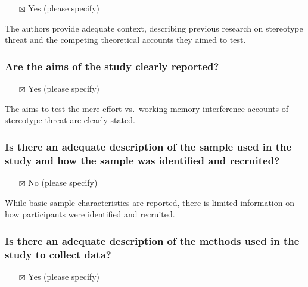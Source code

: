 \documentclass[
  doc, a4paper]{apa7}
\providecommand{\tightlist}{%
  \setlength{\itemsep}{0pt}\setlength{\parskip}{0pt}}
\begin{document}
\begin{itemize}
\tightlist
\item[$\boxtimes$]
  Yes (please specify)
\end{itemize}

The authors provide adequate context, describing previous research on stereotype threat and the competing theoretical accounts they aimed to test.

\subsubsection{Are the aims of the study clearly reported?}\label{are-the-aims-of-the-study-clearly-reported}

\begin{itemize}
\tightlist
\item[$\boxtimes$]
  Yes (please specify)
\end{itemize}

The aims to test the mere effort vs.~working memory interference accounts of stereotype threat are clearly stated.

\subsubsection{Is there an adequate description of the sample used in the study and how the sample was identified and recruited?}\label{is-there-an-adequate-description-of-the-sample-used-in-the-study-and-how-the-sample-was-identified-and-recruited}

\begin{itemize}
\tightlist
\item[$\boxtimes$]
  No (please specify)
\end{itemize}

While basic sample characteristics are reported, there is limited information on how participants were identified and recruited.

\subsubsection{Is there an adequate description of the methods used in the study to collect data?}\label{is-there-an-adequate-description-of-the-methods-used-in-the-study-to-collect-data}

\begin{itemize}
\tightlist
\item[$\boxtimes$]
  Yes (please specify)
\end{itemize}
\end{document}
